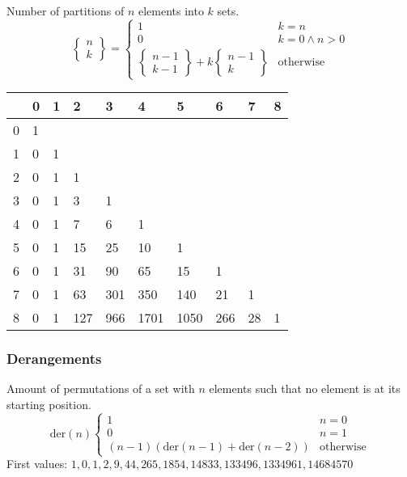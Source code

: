Number of partitions of $n$ elements into $k$ sets.
\begin{equation*}
  \begin{Bmatrix}
    n\\k
  \end{Bmatrix} =
  \begin{cases}
    1 & k = n\\
    0 & k = 0 \land n > 0 \\
    \left\{
      \begin{smallmatrix}
        n - 1\\k - 1
      \end{smallmatrix}
\right\} + k \left\{
  \begin{smallmatrix}
    n - 1\\k
  \end{smallmatrix}
\right\} & \text{otherwise}
  \end{cases}
\end{equation*}
\begin{center}
	\begin{tabular}{ |l||l|l|l|l|l|l|l|l|l| } 
		\hline
		\diagbox{$n$}{$k$} & 0 & 1 & 2 & 3 & 4 & 5 & 6 & 7  & 8 \\
		\hline\hline
		0 & 1 &      & & & & & & & \\
		1 & 0 &  1 &     &     &      &      &     &     &  \\
		2 & 0 &  1 & 1   &     &      &      &     &     &  \\
		3 & 0 & 1 & 3   & 1   &      &      &     &     &  \\
		4 & 0 &  1 & 7   & 6   & 1    &      &     &     &  \\
		5 & 0 &  1 & 15  & 25  & 10   & 1    &     &     &  \\
		6 & 0 &  1 & 31  & 90  & 65   & 15   & 1   &     &  \\
		7 & 0 &  1 & 63  & 301 & 350  & 140  & 21  & 1   &  \\
		8 & 0 &  1 & 127 & 966 & 1701 & 1050 & 266 & 28 & 1 \\
		\hline
	\end{tabular}
\end{center}

\subsubsection{Derangements}
Amount of permutations of a set with $n$ elements such that no element
is at its starting position.
\begin{equation*}
  \text{der}(n)
  \begin{cases}
    1 & n = 0\\
    0 & n = 1\\
    (n - 1)(\text{der}(n - 1) + \text{der}(n - 2)) & \text{otherwise}
  \end{cases}
\end{equation*}
First values: $1, 0, 1, 2, 9, 44, 265, 1854, 14833, 133496, 1334961, 14684570$

